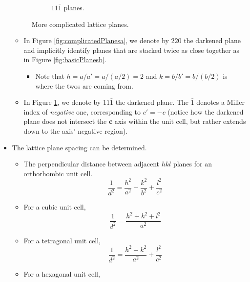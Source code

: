 \documentclass[../notes.tex]{subfiles}
\begin{document}
\begin{itemize}
\begin{figure}[H]
\begin{subfigure}[b]{0.2\linewidth}
            \caption{$11\bar{1}$ planes.}
            \label{fig:complicatedPlanesb}
        \end{subfigure}
        \caption{More complicated lattice planes.}
        \label{fig:complicatedPlanes}
    \end{figure}
    \begin{itemize}
        \item In Figure \ref{fig:complicatedPlanesa}, we denote by $220$ the darkened plane and implicitly identify planes that are stacked twice as close together as in Figure \ref{fig:basicPlanesb}.
        \begin{itemize}
            \item Note that $h=a/a'=a/(a/2)=2$ and $k=b/b'=b/(b/2)$ is where the twos are coming from.
        \end{itemize}
        \item In Figure \ref{fig:complicatedPlanesb}, we denote by $11\bar{1}$ the darkened plane. The $\bar{1}$ denotes a Miller index of \emph{negative} one, corresponding to $c'=-c$ (notice how the darkened plane does not intersect the \textbf{c} axis within the unit cell, but rather extends down to the axis' negative region).
    \end{itemize}
    \item The lattice plane spacing can be determined.
    \begin{itemize}
        \item The perpendicular distance between adjacent $hkl$ planes for an orthorhombic unit cell.
        \begin{equation*}
            \frac{1}{d^2} = \frac{h^2}{a^2}+\frac{k^2}{b^2}+\frac{l^2}{c^2}
        \end{equation*}
        \item For a cubic unit cell,
        \begin{equation*}
            \frac{1}{d^2} = \frac{h^2+k^2+l^2}{a^2}
        \end{equation*}
        \item For a tetragonal unit cell,
        \begin{equation*}
            \frac{1}{d^2} = \frac{h^2+k^2}{a^2}+\frac{l^2}{c^2}
        \end{equation*}
        \item For a hexagonal unit cell,

\end{itemize}
\end{itemize}
\end{document}
